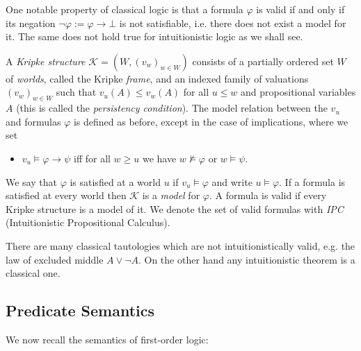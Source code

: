 \documentclass[runningheads]{llncs}
\begin{document}
One notable property of classical logic is that a formula $\varphi$ is valid if and only if its negation $\neg\varphi := \varphi\to\bot$ is not satisfiable, i.e. there does not exist a model for it. The same does not hold true for intuitionistic logic as we shall see.

\begin{definition}
	A \emph{Kripke structure} $\mathcal K = (W, (v_w)_{w\in W})$ consists of a partially ordered set $W$ of \emph{worlds}, called the Kripke \emph{frame}, and an indexed family of valuations $(v_w)_{w\in W}$ such that $v_u(A)\leq v_w(A)$ for all $u\leq w$ and propositional variables $A$ (this is called the \emph{persistency condition}).
	The model relation between the $v_u$ and formulas $\varphi$ is defined as before, except in the case of implications, where we set
	\begin{itemize}
		\item $v_u\models\varphi\to \psi$ iff for all $w\geq u$ we have $w\not\models\varphi$ or $w\models\psi$.
	\end{itemize}
	We say that $\varphi$ is satisfied at a world $u$ if $v_u\models\varphi$ and write $u\models\varphi$. If a formula is satisfied at every world then $\mathcal K$ is a \emph{model} for $\varphi$. A formula is valid if every Kripke structure is a model of it. We denote the set of valid formulas with \emph{IPC} (Intuitionistic Propositional Calculus).
\end{definition}
There are many classical tautologies which are not intuitionistically valid, e.g. the law of excluded middle $A\vee\neg A$. On the other hand any intuitionistic theorem is a classical one.

\subsection{Predicate Semantics}

We now recall the semantics of first-order logic:
\end{document}
